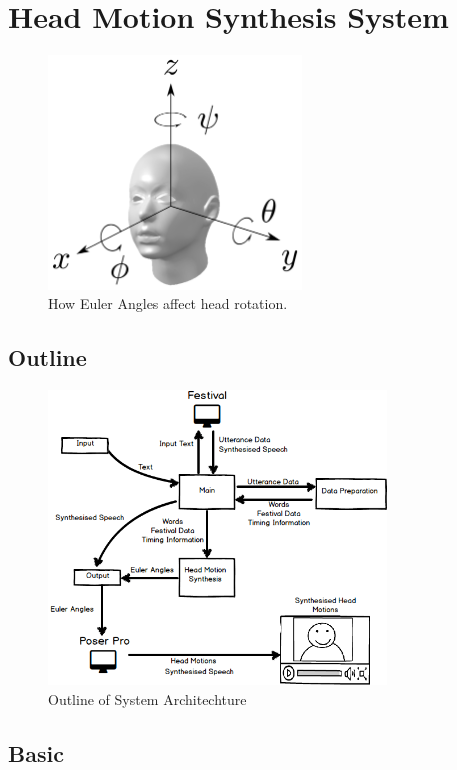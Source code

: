 \documentclass[bsc,frontabs,twoside,singlespacing,parskip]{infthesis}
\begin{document}
\section{Head Motion Synthesis System}

\begin{figure}
	\centering
	\includegraphics[width=0.6\textwidth]{head_with_euler.png}
	\caption{How Euler Angles affect head rotation.}
\end{figure}


\subsection{Outline}

\begin{figure}
	\centering
	\includegraphics[width=0.8\textwidth]{system.png}
	\caption{Outline of System Architechture}
\end{figure}

\subsection{Basic}
\end{document}
